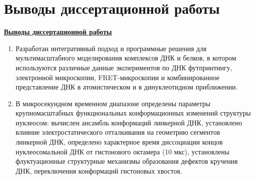 \ifdefined\DISSER  
\section*{Выводы диссертационной работы}
\else 
\underline{\textbf{Выводы диссертационной работы}}
\fi

\begin{enumerate}
\item Разработан интегративный подход и программные решения для мультимасштабного моделирования комплексов ДНК и белков, в котором используются различные данные экспериментов по ДНК футпринтингу, электронной микроскопии, FRET-микроскопии и комбинированное представление ДНК в атомистическом и в динуклеотидном приближении.


  \item В микросекундном временном диапазоне определены параметры крупномасштабных функциональных конформационных изменений структуры нуклеосом: вычислен ансамбль конформаций линкерной ДНК, установлено влияние электростатического отталкивания на геометрию сегментов линкерной ДНК, определено характерное время диссоциации концов нуклеосомальной ДНК от гистонового октамера (10 мкс), установлены флуктуационные структурные механизмы образования дефектов кручения ДНК, переключения конформаций гистоновых хвостов.



\end{enumerate}
